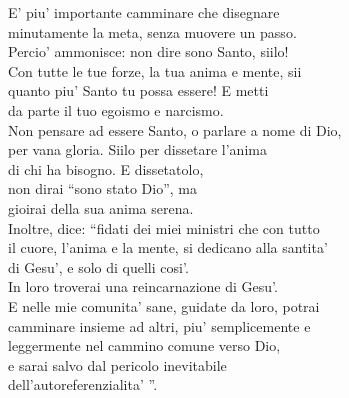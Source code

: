 \begin{haiku}
    E' piu' importante camminare che disegnare \\
    minutamente la meta, senza muovere un passo.\\
    Percio' ammonisce: non dire sono Santo, siilo! \\
    Con tutte le tue forze, la tua anima e mente, sii \\
    quanto piu' Santo tu possa essere! E metti\\
    da parte il tuo egoismo e narcismo.\\
    Non pensare ad essere Santo, o parlare a nome di Dio,\\
    per vana gloria. Siilo per dissetare l'anima \\
    di chi ha bisogno. E dissetatolo, \\
    non dirai ``sono stato Dio'', ma \\
    gioirai della sua anima serena.\\
    Inoltre, dice: ``fidati dei miei ministri che con tutto\\
    il cuore, l'anima e la mente, si dedicano alla santita'\\
    di Gesu', e solo di quelli cosi'.\\
    In loro troverai una reincarnazione di Gesu'.\\
    E nelle mie comunita' sane, guidate da loro, potrai \\
    camminare insieme ad altri, piu' semplicemente e\\
    leggermente nel cammino comune verso Dio, \\
    e sarai salvo dal pericolo inevitabile\\
    dell'autoreferenzialita' ''.\\
\end{haiku}
